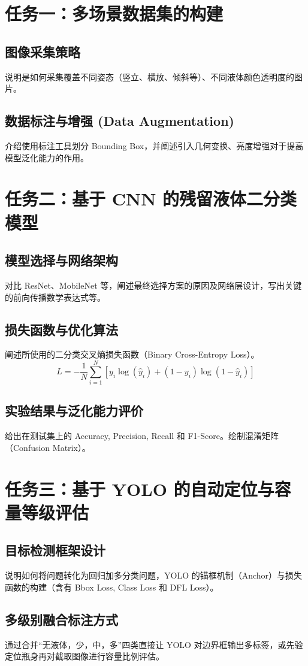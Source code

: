 \documentclass[12pt,a4paper]{ctexart}
\begin{document}
\section{任务一：多场景数据集的构建}
\subsection{图像采集策略}
说明是如何采集覆盖不同姿态（竖立、横放、倾斜等）、不同液体颜色透明度的图片。
\subsection{数据标注与增强 (Data Augmentation)}
介绍使用标注工具划分 Bounding Box，并阐述引入几何变换、亮度增强对于提高模型泛化能力的作用。

\section{任务二：基于 CNN 的残留液体二分类模型}
\subsection{模型选择与网络架构}
对比 ResNet、MobileNet 等，阐述最终选择方案的原因及网络层设计，写出关键的前向传播数学表达式等。
\subsection{损失函数与优化算法}
阐述所使用的二分类交叉熵损失函数（Binary Cross-Entropy Loss）。
$$ L = -\frac{1}{N}\sum_{i=1}^{N}[y_i \log(\hat{y}_i) + (1-y_i)\log(1-\hat{y}_i)] $$
\subsection{实验结果与泛化能力评价}
给出在测试集上的 Accuracy, Precision, Recall 和 F1-Score。绘制混淆矩阵（Confusion Matrix）。

\section{任务三：基于 YOLO 的自动定位与容量等级评估}
\subsection{目标检测框架设计}
说明如何将问题转化为回归加多分类问题，YOLO 的锚框机制（Anchor）与损失函数的构建（含有 Bbox Loss, Class Loss 和 DFL Loss）。
\subsection{多级别融合标注方式}
通过合并“无液体，少，中，多”四类直接让 YOLO 对边界框输出多标签，或先验定位瓶身再对截取图像进行容量比例评估。
\end{document}
